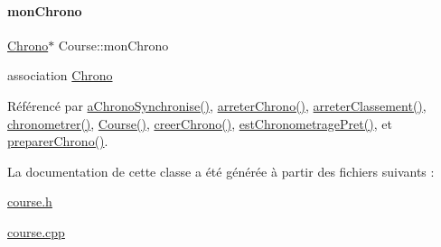 \paragraph{\texorpdfstring{mon\+Chrono}{monChrono}}
{\footnotesize\ttfamily \hyperlink{class_chrono}{Chrono}$\ast$ Course\+::mon\+Chrono\hspace{0.3cm}{\ttfamily [private]}}



association \hyperlink{class_chrono}{Chrono} 



Référencé par \hyperlink{class_course_a90c66d620f0726d92c40069f052e0cd0}{a\+Chrono\+Synchronise()}, \hyperlink{class_course_a939635ac8301a7018475cc2ce347375f}{arreter\+Chrono()}, \hyperlink{class_course_a4426310a411d8ecf7f4a2dc64c24a42d}{arreter\+Classement()}, \hyperlink{class_course_a589447dd63dca89395119ffd4e4a8c8c}{chronometrer()}, \hyperlink{class_course_af6317ecab95f8a2eb205b4f91b530992}{Course()}, \hyperlink{class_course_a6eb96222d8dc1f352e28f36e9b414448}{creer\+Chrono()}, \hyperlink{class_course_a44a14d431bd64a507f2c2aa5f465b1b0}{est\+Chronometrage\+Pret()}, et \hyperlink{class_course_a50596f54553b48fa29170a6b42b6e9d4}{preparer\+Chrono()}.



La documentation de cette classe a été générée à partir des fichiers suivants \+:\begin{DoxyCompactItemize}
\item 
\hyperlink{course_8h}{course.\+h}\item 
\hyperlink{course_8cpp}{course.\+cpp}\end{DoxyCompactItemize}
